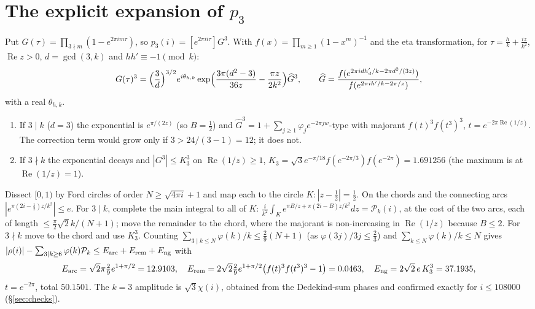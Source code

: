 \documentclass[11pt,reqno]{amsart}
\theoremstyle{plain}
\theoremstyle{definition}
\newcommand{\cP}{\mathcal{P}}
\renewcommand{\Re}{\operatorname{Re}}
\begin{document}
\appendix
\section{The explicit expansion of $p_3$}\label{app:expansion}
Put $G(\tau)=\prod_{3\nmid m}(1-e^{2\pi im\tau})$, so $p_3(i)=[e^{2\pi i i\tau}]G^3$. With $f(x)=\prod_{m\ge1}(1-x^m)^{-1}$ and the
eta transformation, for $\tau=\frac hk+\frac{iz}{k^2}$, $\Re z>0$, $d=\gcd(3,k)$ and $hh'\equiv-1\pmod k$:
\[
G(\tau)^3=\Bigl(\frac3d\Bigr)^{3/2}e^{i\theta_{h,k}}\exp\Bigl(\frac{3\pi(d^2-3)}{36z}-\frac{\pi z}{2k^2}\Bigr)\widehat G^3,\qquad
\widehat G=\frac{f(e^{2\pi idh'_d/k-2\pi d^2/(3z)})}{f(e^{2\pi ih'/k-2\pi/z})},
\]
with a real $\theta_{h,k}$.
\begin{enumerate}
\item If $3\mid k$ ($d=3$) the exponential is $e^{\pi/(2z)}$ (so $B=\frac12$) and $\widehat G^3=1+\sum_{j\ge1}\varphi_je^{-2\pi jw}$-type with
majorant $f(t)^3f(t^3)^3$, $t=e^{-2\pi\Re(1/z)}$. The correction term would grow only if $3>24/(3-1)=12$; it does not.
\item If $3\nmid k$ the exponential decays and $|G^3|\le K_3^3$ on $\Re(1/z)\ge1$, $K_3=\sqrt3e^{-\pi/18}f(e^{-2\pi/3})f(e^{-2\pi})=1.691256$
(the maximum is at $\Re(1/z)=1$).
\end{enumerate}
Dissect $[0,1)$ by Ford circles of order $N\ge\sqrt{4\pi i}+1$ and map each to the circle $K:|z-\frac12|=\frac12$. On the chords and the
connecting arcs $|e^{\pi(2i-\frac12)z/k^2}|\le e$. For $3\mid k$, complete the main integral to all of $K$: $\frac i{k^2}\int_K
e^{\pi B/z+\pi(2i-B)z/k^2}dz=\cP_k(i)$, at the cost of the two arcs, each of length $\le\frac\pi2\sqrt2k/(N+1)$; move the remainder to the
chord, where the majorant is non-increasing in $\Re(1/z)$ because $B\le2$. For $3\nmid k$ move to the chord and use $K_3^3$. Counting
$\sum_{3\mid k\le N}\varphi(k)/k\le\frac29(N+1)$ (as $\varphi(3j)/3j\le\frac23$) and $\sum_{k\le N}\varphi(k)/k\le N$ gives
$|\rho(i)|-\sum_{3\mid k\ge6}\varphi(k)\cP_k\le E_{\rm arc}+E_{\rm rem}+E_{\rm ng}$ with
\[
E_{\rm arc}=\sqrt2\pi\tfrac29e^{1+\pi/2}=12.9103,\quad
E_{\rm rem}=2\sqrt2\tfrac29e^{1+\pi/2}\bigl(f(t)^3f(t^3)^3-1\bigr)=0.0463,\quad
E_{\rm ng}=2\sqrt2\,e\,K_3^3=37.1935,
\]
$t=e^{-2\pi}$, total $50.1501$. The $k=3$ amplitude is $\sqrt3\chi(i)$, obtained from the Dedekind-sum phases and confirmed exactly
for $i\le108000$ (\S\ref{sec:checks}).
\end{document}
